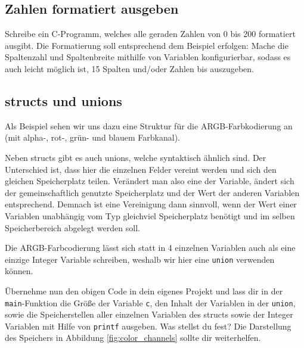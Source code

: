 \subsection{Zahlen formatiert ausgeben}
\label{sec:CFormatNumbers}
Schreibe ein C-Programm, welches alle geraden Zahlen von 0 bis 200 formatiert ausgibt.
Die Formatierung soll entsprechend dem Beispiel erfolgen:
%
%
Mache die Spaltenzahl und Spaltenbreite mithilfe von Variablen konfigurierbar, sodass es auch leicht möglich ist, 15 Spalten und/oder Zahlen bis  auszugeben.

\subsection{structs und unions}


Als Beispiel sehen wir uns dazu eine Struktur für die ARGB-Farbkodierung an (mit alpha-, rot-, grün- und blauem Farbkanal). 



Neben structs gibt es auch unions, welche syntaktisch ähnlich sind.
Der Unterschied ist, dass hier die einzelnen Felder vereint werden und sich den gleichen Speicherplatz teilen. 
Verändert man also eine der Variable, ändert sich der gemeinschaftlich genutzte Speicherplatz und der Wert der anderen Variablen entsprechend. 
Demnach ist eine Vereinigung dann sinnvoll, wenn der Wert einer Variablen unabhängig vom Typ gleichviel Speicherplatz benötigt und im selben Speicherbereich abgelegt werden soll.


Die ARGB-Farbcodierung lässt sich statt in 4 einzelnen Variablen auch als eine einzige Integer Variable schreiben, weshalb wir hier eine \lstinline{union} verwenden können.





Übernehme nun den obigen Code in dein eigenes Projekt und lass dir in der \lstinline{main}-Funktion die Größe der Variable \lstinline{c}, den Inhalt der Variablen in der \lstinline{union}, sowie die Speicherstellen aller einzelnen Variablen des structs sowie der Integer Variablen mit Hilfe von \lstinline{printf} ausgeben. 
Was stellst du fest? 
Die Darstellung des Speichers in Abbildung \ref{fig:color_channels} sollte dir weiterhelfen.

